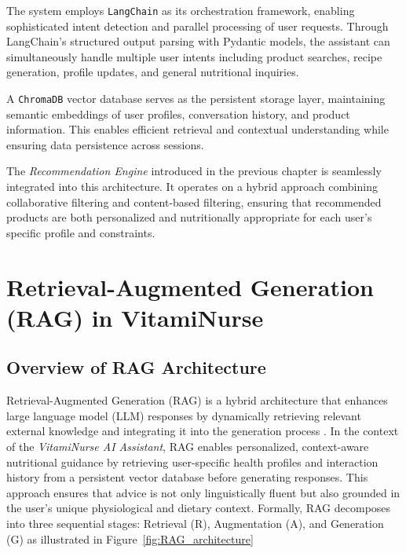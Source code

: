 The system employs \texttt{LangChain} as its orchestration framework, enabling sophisticated intent detection and parallel processing of user requests. Through LangChain's structured output parsing with Pydantic models, the assistant can simultaneously handle multiple user intents including product searches, recipe generation, profile updates, and general nutritional inquiries.

A \texttt{ChromaDB} vector database serves as the persistent storage layer, maintaining semantic embeddings of user profiles, conversation history, and product information. This enables efficient retrieval and contextual understanding while ensuring data persistence across sessions.

The \emph{Recommendation Engine} introduced in the previous chapter is seamlessly integrated into this architecture. It operates on a hybrid approach combining collaborative filtering and content-based filtering, ensuring that recommended products are both personalized and nutritionally appropriate for each user's specific profile and constraints.


\section{Retrieval-Augmented Generation (RAG) in VitamiNurse}
\label{sec:rag}
\subsection{Overview of RAG Architecture}
\par Retrieval-Augmented Generation (RAG) is a hybrid architecture that enhances large language model (LLM) responses by dynamically retrieving relevant external knowledge and integrating it into the generation process \cite{lewis2020retrieval}. In the context of the \textit{VitamiNurse AI Assistant}, RAG enables personalized, context-aware nutritional guidance by retrieving user-specific health profiles and interaction history from a persistent vector database before generating responses. This approach ensures that advice is not only linguistically fluent but also grounded in the user’s unique physiological and dietary context. Formally, RAG decomposes into three sequential stages: Retrieval (R), Augmentation (A), and Generation (G) as illustrated in Figure~\ref{fig:RAG_architecture}

